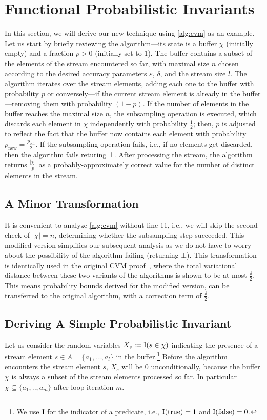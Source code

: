 \section{Functional Probabilistic Invariants}\label{sec:invariants}
In this section, we will derive our new technique using \cref{alg:cvm} as an example.
Let us start by briefly reviewing the algorithm---its state is a buffer $\chi$ (initially empty) and a fraction $p > 0$ (initially set to $1$).
The buffer contains a subset of the elements of the stream encountered so far, with maximal size $n$ chosen according to the desired accuracy parameters $\varepsilon$, $\delta$, and the stream size $l$.
The algorithm iterates over the stream elements, adding each one to the buffer with probability $p$ or conversely---if the current stream element is already in the buffer---removing them with probability $(1-p)$.
If the number of elements in the buffer reaches the maximal size $n$, the subsampling operation is executed, which discards each element in $\chi$ independently with probability $\frac{1}{2}$; then, $p$ is adjusted to reflect the fact that the buffer now contains each element with probability $p_\text{new} = \frac{p_\text{old}}{2}$.
If the subsampling operation fails, i.e., if no elements get discarded, then the algorithm fails returing $\bot$.
After processing the stream, the algorithm returns $\frac{|\chi|}{p}$ as a probably-approximately correct value for the number of distinct elements in the stream.

\subsection{A Minor Transformation}
It is convenient to analyze \cref{alg:cvm} without line 11, i.e., we will skip the second check of $|\chi|=n$, determining whether the subsampling step succeeded.
This modified version simplifies our subsequent analysis as we do not have to worry about the possibility of the algorithm failing (returning $\bot$).
This transformation is identically used in the original CVM proof~\cite{chakraborty2023}, where the total variational distance between these two variants of the algorithms is shown to be at most $\frac{\delta}{2}$.
This means probability bounds derived for the modified version, can be transferred to the original algorithm, with a correction term of $\frac{\delta}{2}$.

\subsection{Deriving A Simple Probabilistic Invariant}
Let us consider the random variables $X_s := \operatorname{\mathrm{I}}(s \in \chi)$ indicating the presence of a stream element $s \in A = \{a_1,\ldots,a_l\}$ in the buffer.\footnote{We use $\operatorname{\mathrm{I}}$ for the indicator of a predicate, i.e., $\operatorname{\mathrm{I}}(\mathrm{true}) = 1$ and $\operatorname{\mathrm{I}}(\mathrm{false}) = 0$.}
Before the algorithm encounters the stream element $s$, $X_s$ will be $0$ unconditionally, because the buffer $\chi$ is always a subset of the stream elements processed so far.
In particular $\chi \subseteq \{a_1,..,a_m\}$ after loop iteration $m$.

